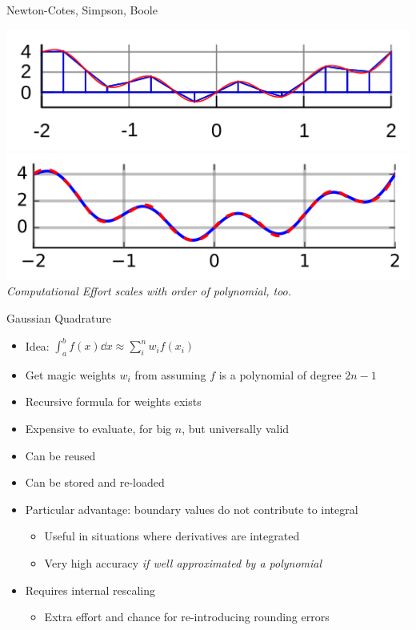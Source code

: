 \begin{frame}{Newton-Cotes, Simpson, Boole}
\begin{minipage}{.39\linewidth}
\includegraphics[width=\linewidth]{./gfx/03-rule02-trapezoid}
\includegraphics[width=\linewidth]{./gfx/03-rule03-simpson}
%
\emph{Computational Effort scales with order of polynomial, too.}
\end{minipage}
%
\end{frame}


\begin{frame}{Gaussian Quadrature}
%
\begin{itemize}
\item Idea: $\displaystyle \int_a^b f(x) \dd{x} \approx \sum_i^n w_i f(x_i)$
\item Get magic weights $w_i$ from assuming $f$ is a polynomial of degree $2n - 1$
\item Recursive formula for weights exists
\item Expensive to evaluate, for big $n$, but universally valid
\item[\Thus] Can be reused
\item[\Thus] Can be stored and re-loaded
\item Particular advantage: boundary values do not contribute to integral
	\begin{itemize}
	\item Useful in situations where derivatives are integrated
	\item Very high accuracy \emph{if well approximated by a polynomial}
	\end{itemize}
\item Requires internal rescaling
	\begin{itemize}
	\item Extra effort and chance for re-introducing rounding errors
	\end{itemize}
\end{itemize}
%
\end{frame}

